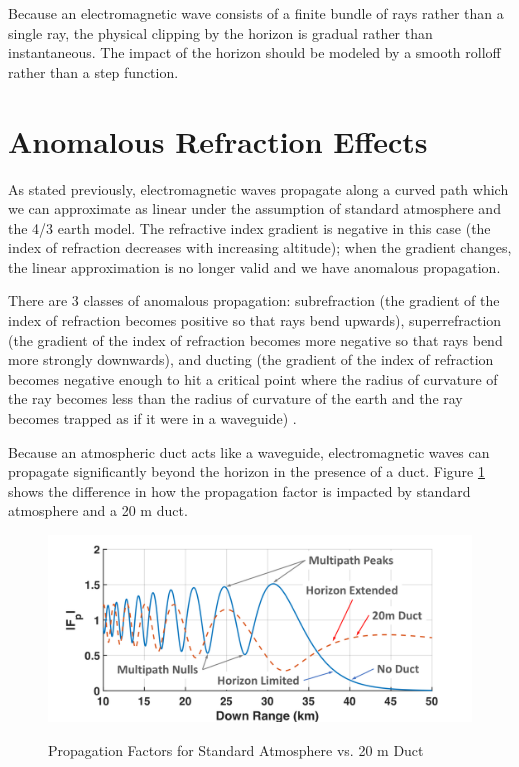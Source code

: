 Because an electromagnetic wave consists of a finite bundle of rays rather than a single ray, the physical clipping by the horizon is gradual rather than instantaneous. The impact of the horizon should be modeled by a smooth rolloff rather than a step function.
  
\section{Anomalous Refraction Effects}
As stated previously, electromagnetic waves propagate along a curved path which we can approximate as linear under the assumption of standard atmosphere and the 4/3 earth model. The refractive index gradient is negative in this case (the index of refraction decreases with increasing altitude); when the gradient changes, the linear approximation is no longer valid and we have anomalous propagation. 

There are 3 classes of anomalous propagation: subrefraction (the gradient of the index of refraction becomes positive so that rays bend upwards), superrefraction (the gradient of the index of refraction becomes more negative so that rays bend more strongly downwards), and ducting (the gradient of the index of refraction becomes negative enough to hit a critical point where the radius of curvature of the ray becomes less than the radius of curvature of the earth and the ray becomes trapped as if it were in a waveguide) \cite{blake_radar}.

Because an atmospheric duct acts like a waveguide, electromagnetic waves can propagate significantly beyond the horizon in the presence of a duct. Figure \ref{env_fig:2z} shows the difference in how the propagation factor is impacted by standard atmosphere and a 20 m duct.
\begin{figure}[H]
  \begin{center}
\includegraphics[width=5in]{../media/multistatic/multipath.png}
  \end{center}
  \renewcommand{\baselinestretch}{1} \small\normalsize
  \begin{quote}
    \caption[Propagation Factors for Standard Atmosphere vs. 20 m Duct]{Propagation Factors for Standard Atmosphere vs. 20 m Duct\label{env_fig:2z}}
  \end{quote}
\end{figure}
\renewcommand{\baselinestretch}{2} \small\normalsize

